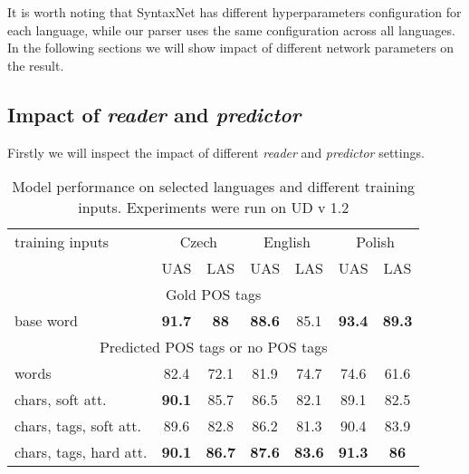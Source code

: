 It is worth noting that SyntaxNet has different hyperparameters configuration
for each language, while our parser uses the same configuration across all languages.
In the following sections we will show impact of different network parameters
on the result.

\subsection{Impact of \emph{reader} and \emph{predictor}}
Firstly we will inspect the impact of different \emph{reader} and \emph{predictor}
settings.
\begin{table}[!htbp]
  \centering
  \label{tab:results}
  \begin{tabular}{l|cc|cc|cc|}
    training inputs & \multicolumn{2}{c|}{Czech} & \multicolumn{2}{c|}{English} & \multicolumn{2}{c|}{Polish} \\
    & UAS & LAS & UAS & LAS & UAS & LAS \\ 
    \multicolumn{7}{c}{Gold POS tags} \\  \hline
    base word & 
    \textbf{91.7} & \textbf{88} & 
    \textbf{88.6} & 85.1 & 
    \textbf{93.4} & \textbf{89.3} \\
    \multicolumn{7}{c}{Predicted POS tags or no POS tags} \\ \hline
    words & 
    82.4 & 72.1 &
    81.9 & 74.7 & 
    74.6 & 61.6  \\
    chars, soft att. & 
    \textbf{90.1} & 85.7 & %
    86.5 & 82.1 & %
    89.1 & 82.5 \\ %
    chars, tags, soft att. & 
    89.6 & 82.8 & %
    86.2 & 81.3 & %
    90.4 & 83.9 \\ %
    chars, tags, hard att. & 
    \textbf{90.1} & \textbf{86.7} & %
    \textbf{87.6} & \textbf{83.6} & %
    \textbf{91.3} & \textbf{86} \\ %
  \end{tabular}
  \caption{Model performance on selected languages and different training inputs. Experiments were run on UD v 1.2} 
\end{table}

